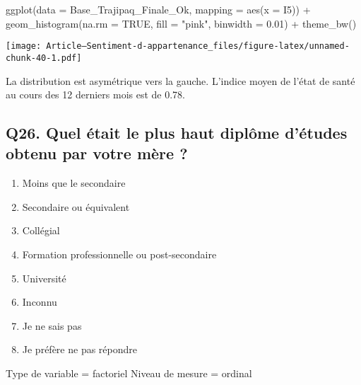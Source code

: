 \documentclass[
]{article}
\newenvironment{Shaded}{\begin{snugshade}}{\end{snugshade}}
\newcommand{\AttributeTok}[1]{\textcolor[rgb]{0.77,0.63,0.00}{#1}}
\newcommand{\ConstantTok}[1]{\textcolor[rgb]{0.00,0.00,0.00}{#1}}
\newcommand{\FloatTok}[1]{\textcolor[rgb]{0.00,0.00,0.81}{#1}}
\newcommand{\FunctionTok}[1]{\textcolor[rgb]{0.00,0.00,0.00}{#1}}
\newcommand{\NormalTok}[1]{#1}
\newcommand{\SpecialCharTok}[1]{\textcolor[rgb]{0.00,0.00,0.00}{#1}}
\newcommand{\StringTok}[1]{\textcolor[rgb]{0.31,0.60,0.02}{#1}}
\providecommand{\tightlist}{%
  \setlength{\itemsep}{0pt}\setlength{\parskip}{0pt}}
\begin{document}
\begin{Shaded}
\begin{Highlighting}[]
\FunctionTok{ggplot}\NormalTok{(}\AttributeTok{data =}\NormalTok{ Base\_Trajipaq\_Finale\_Ok, }\AttributeTok{mapping =} \FunctionTok{aes}\NormalTok{(}\AttributeTok{x =}\NormalTok{ I5)) }\SpecialCharTok{+}
  \FunctionTok{geom\_histogram}\NormalTok{(}\AttributeTok{na.rm =} \ConstantTok{TRUE}\NormalTok{, }\AttributeTok{fill =} \StringTok{"pink"}\NormalTok{, }\AttributeTok{binwidth =} \FloatTok{0.01}\NormalTok{) }\SpecialCharTok{+}
  \FunctionTok{theme\_bw}\NormalTok{()}
\end{Highlighting}
\end{Shaded}

\texttt{[image: Article---Sentiment-d-appartenance\_files/figure-latex/unnamed-chunk-40-1.pdf]}

La distribution est asymétrique vers la gauche. L'indice moyen de l'état
de santé au cours des 12 derniers mois est de 0.78.

\hypertarget{q26.-quel-uxe9tait-le-plus-haut-dipluxf4me-duxe9tudes-obtenu-par-votre-muxe8re}{%
\subsection{Q26. Quel était le plus haut diplôme d'études obtenu par
votre mère
?}\label{q26.-quel-uxe9tait-le-plus-haut-dipluxf4me-duxe9tudes-obtenu-par-votre-muxe8re}}

\begin{enumerate}
\def\labelenumi{\arabic{enumi}.}
\tightlist
\item
  Moins que le secondaire
\item
  Secondaire ou équivalent
\item
  Collégial
\item
  Formation professionnelle ou post-secondaire
\item
  Université
\item
  Inconnu
\item
  Je ne sais pas
\item
  Je préfère ne pas répondre
\end{enumerate}

Type de variable = factoriel Niveau de mesure = ordinal
\end{document}
